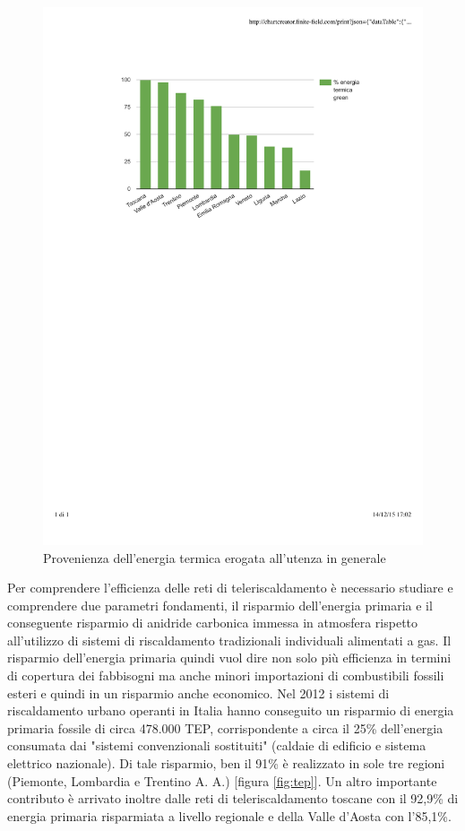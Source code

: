 \documentclass[laurea,oneside,11pt]{USiena_tesiLM}
\begin{document}
\begin{figure}[!ht]
\centering
\includegraphics[width=\textwidth]{figure/energia_green} 
\caption{Provenienza dell'energia termica erogata all'utenza in generale}
\label{fig:energia_green}
\end{figure}

Per comprendere l'efficienza delle reti di teleriscaldamento è necessario studiare e comprendere due parametri fondamenti, il risparmio dell'energia primaria e il conseguente risparmio di anidride carbonica immessa in atmosfera rispetto all'utilizzo di sistemi di riscaldamento tradizionali individuali alimentati a gas. Il risparmio dell'energia primaria quindi vuol dire non solo più efficienza in termini di copertura dei fabbisogni ma anche minori importazioni di combustibili fossili esteri e quindi in un risparmio anche economico. Nel 2012 i sistemi di riscaldamento urbano operanti in Italia hanno conseguito un risparmio di energia primaria fossile di circa 478.000 TEP, corrispondente a circa il 25\% dell'energia consumata dai "sistemi convenzionali sostituiti" (caldaie di edificio e sistema elettrico nazionale). Di tale risparmio, ben il 91\% è realizzato in sole tre regioni (Piemonte, Lombardia e Trentino A. A.) [figura \ref{fig:tep}]. 
Un altro importante contributo è arrivato inoltre dalle reti di teleriscaldamento toscane con il 92,9\% di energia primaria risparmiata a livello regionale e della Valle d'Aosta con l'85,1\%.
\end{document}
